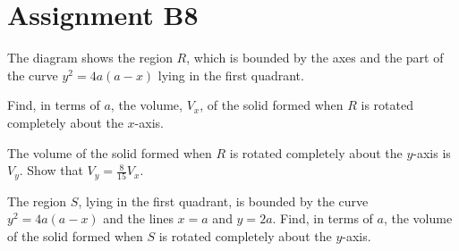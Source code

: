 \section{Assignment B8}

\begin{problem}
    The diagram shows the region $R$, which is bounded by the axes and the part of the curve $y^2 = 4a(a-x)$ lying in the first quadrant.

    Find, in terms of $a$, the volume, $V_x$, of the solid formed when $R$ is rotated completely about the $x$-axis.

    The volume of the solid formed when $R$ is rotated completely about the $y$-axis is $V_y$. Show that $V_y = \frac8{15} V_x$.

    The region $S$, lying in the first quadrant, is bounded by the curve $y^2 = 4a(a-x)$ and the lines $x = a$ and $y = 2a$. Find, in terms of $a$, the volume of the solid formed when $S$ is rotated completely about the $y$-axis.

    \begin{center}
    \end{center}
\end{problem}

